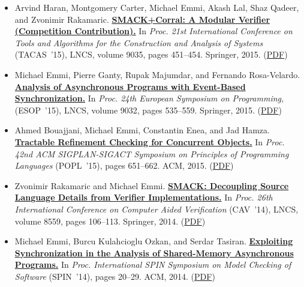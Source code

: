 \documentclass{article}
\begin{document}
\begin{itemize}[leftmargin=0cm,label={}]
    \item Arvind Haran, Montgomery Carter, Michael Emmi, Akash Lal, Shaz Qadeer, and Zvonimir Rakamaric. {\bf\href{%
    http://dx.doi.org/10.1007/978-3-662-46681-0_42}{%
    SMACK+Corral: A Modular Verifier (Competition Contribution).}} In \emph{ Proc. 21st International Conference on Tools and Algorithms for the Construction and Analysis of Systems } (TACAS ’15), LNCS, volume 9035, pages 451–454. Springer, 2015. (\href{https://michael-emmi.github.io/https://github.com/michael-emmi/research-papers/raw/master/conf-tacas-HaranCELQR15.pdf}{PDF})


    \item Michael Emmi, Pierre Ganty, Rupak Majumdar, and Fernando Rosa-Velardo. {\bf\href{%
    http://dx.doi.org/10.1007/978-3-662-46669-8_22}{%
    Analysis of Asynchronous Programs with Event-Based Synchronization.}} In \emph{ Proc. 24th European Symposium on Programming, } (ESOP ’15), LNCS, volume 9032, pages 535–559. Springer, 2015. (\href{https://michael-emmi.github.io/https://github.com/michael-emmi/research-papers/raw/master/conf-esop-EmmiGMR15.pdf}{PDF})


    \item Ahmed Bouajjani, Michael Emmi, Constantin Enea, and Jad Hamza. {\bf\href{%
    http://doi.acm.org/10.1145/2676726.2677002}{%
    Tractable Refinement Checking for Concurrent Objects.}} In \emph{ Proc. 42nd ACM SIGPLAN-SIGACT Symposium on Principles of Programming Languages } (POPL ’15), pages 651–662. ACM, 2015. (\href{https://michael-emmi.github.io/https://github.com/michael-emmi/research-papers/raw/master/conf-popl-BouajjaniEEH15.pdf}{PDF})


    \item Zvonimir Rakamaric and Michael Emmi. {\bf\href{%
    http://dx.doi.org/10.1007/978-3-319-08867-9_7}{%
    SMACK: Decoupling Source Language Details from Verifier Implementations.}} In \emph{ Proc. 26th International Conference on Computer Aided Verification } (CAV ’14), LNCS, volume 8559, pages 106–113. Springer, 2014. (\href{https://michael-emmi.github.io/https://github.com/michael-emmi/research-papers/raw/master/conf-cav-RakamaricE14.pdf}{PDF})


    \item Michael Emmi, Burcu Kulahcioglu Ozkan, and Serdar Tasiran. {\bf\href{%
    http://doi.acm.org/10.1145/2632362.2632370}{%
    Exploiting Synchronization in the Analysis of Shared-Memory Asynchronous Programs.}} In \emph{ Proc. International SPIN Symposium on Model Checking of Software } (SPIN ’14), pages 20–29. ACM, 2014. (\href{https://michael-emmi.github.io/https://github.com/michael-emmi/research-papers/raw/master/conf-spin-EmmiOT14.pdf}{PDF})



\end{itemize}
\end{document}
